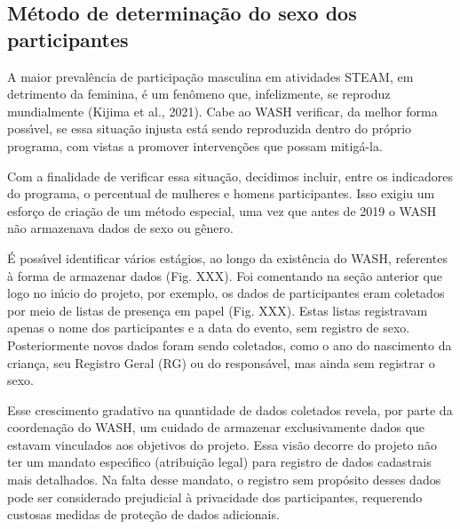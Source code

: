 \documentclass[
12pt,		%
openright,	%
twoside,  %
a4paper,			%
chapter=TITLE,		%
english,			%
french,				%
spanish,			%
brazil				%
]{USPSC-classe/USPSC}
\begin{document}
\subsection[M\'etodo de determina\c{c}\~ao do sexo dos participantes]{M\'etodo de determina\c{c}\~ao do sexo dos participantes}\label{M\'etodo de determina\c{c}\~ao do sexo dos participantes}
A maior preval\^encia de participa\c{c}\~ao masculina em atividades STEAM, em detrimento da feminina, \'e um fen\^omeno que, infelizmente, se reproduz mundialmente (Kijima et al., 2021). Cabe ao WASH verificar, da melhor forma poss\'{\i}vel, se essa situa\c{c}\~ao injusta est\'a sendo reproduzida dentro do pr\'oprio programa, com vistas a promover interven\c{c}\~oes que possam mitig\'a-la.










Com a finalidade de verificar essa situa\c{c}\~ao, decidimos incluir, entre os indicadores do programa, o percentual de mulheres e homens participantes. Isso exigiu um esfor\c{c}o de cria\c{c}\~ao de um m\'etodo especial, uma vez que antes de 2019 o WASH n\~ao armazenava dados de sexo ou g\^enero.










\'E poss\'{\i}vel identificar v\'arios est\'agios, ao longo da exist\^encia do WASH, referentes \`a forma de armazenar dados (Fig. XXX). Foi comentando na se\c{c}\~ao anterior que logo no in\'{\i}cio do projeto, por exemplo, os dados de participantes eram coletados por meio de listas de presen\c{c}a em papel (Fig. XXX). Estas listas registravam apenas o nome dos participantes e a data do evento, sem registro de sexo. Posteriormente novos dados foram sendo coletados, como o ano do nascimento da crian\c{c}a, seu Registro Geral (RG) ou do respons\'avel, mas ainda sem registrar o sexo.










Esse crescimento gradativo na quantidade de dados coletados revela, por parte da coordena\c{c}\~ao do WASH, um cuidado de armazenar exclusivamente dados que estavam vinculados aos objetivos do projeto. Essa vis\~ao decorre do projeto n\~ao ter um mandato espec\'{\i}fico (atribui\c{c}\~ao legal) para registro de dados cadastrais mais detalhados. Na falta desse mandato, o registro sem prop\'osito desses dados pode ser considerado prejudicial \`a privacidade dos participantes, requerendo custosas medidas de prote\c{c}\~ao de dados adicionais.
\end{document}
